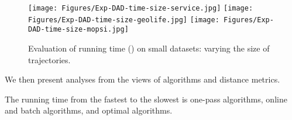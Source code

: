 {\begin{figure*}[tb!]
	\centering
	\texttt{[image: Figures/Exp-DAD-time-size-service.jpg]} 	\hspace{0.5ex}
	\texttt{[image: Figures/Exp-DAD-time-size-geolife.jpg]}	\hspace{0.5ex}
	\texttt{[image: Figures/Exp-DAD-time-size-mopsi.jpg]}		
	\vspace{-2ex}
	\caption{\small Evaluation of running time (\dad) on small datasets: varying the size of trajectories.}\label{fig:time-size-dad}
	\vspace{-2ex}
\end{figure*}






We then present analyses from the views of \lsa algorithms and distance metrics.





The running time from the fastest to the slowest is one-pass algorithms, online and batch algorithms, and optimal algorithms.

}
